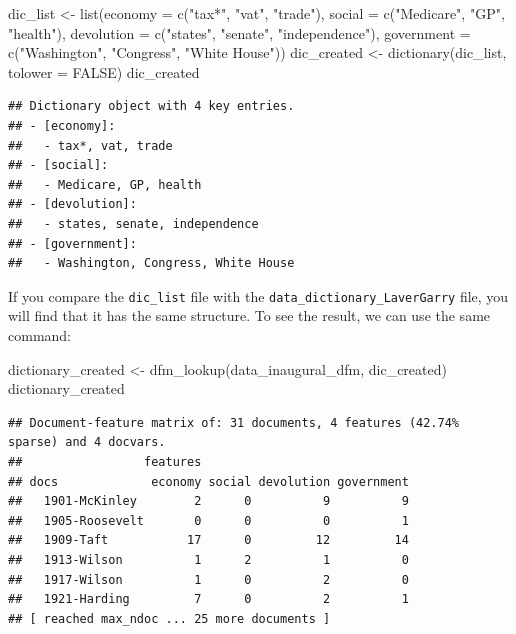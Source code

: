 \documentclass[
]{article}
\newenvironment{Shaded}{\begin{snugshade}}{\end{snugshade}}
\newcommand{\AttributeTok}[1]{\textcolor[rgb]{0.77,0.63,0.00}{#1}}
\newcommand{\ConstantTok}[1]{\textcolor[rgb]{0.00,0.00,0.00}{#1}}
\newcommand{\FunctionTok}[1]{\textcolor[rgb]{0.00,0.00,0.00}{#1}}
\newcommand{\NormalTok}[1]{#1}
\newcommand{\OtherTok}[1]{\textcolor[rgb]{0.56,0.35,0.01}{#1}}
\newcommand{\StringTok}[1]{\textcolor[rgb]{0.31,0.60,0.02}{#1}}
\begin{document}
\begin{Shaded}
\begin{Highlighting}[]
\NormalTok{dic\_list }\OtherTok{\textless{}{-}} \FunctionTok{list}\NormalTok{(}\AttributeTok{economy =} \FunctionTok{c}\NormalTok{(}\StringTok{"tax*"}\NormalTok{, }\StringTok{"vat"}\NormalTok{, }\StringTok{"trade"}\NormalTok{), }\AttributeTok{social =} \FunctionTok{c}\NormalTok{(}\StringTok{"Medicare"}\NormalTok{,}
    \StringTok{"GP"}\NormalTok{, }\StringTok{"health"}\NormalTok{), }\AttributeTok{devolution =} \FunctionTok{c}\NormalTok{(}\StringTok{"states"}\NormalTok{, }\StringTok{"senate"}\NormalTok{, }\StringTok{"independence"}\NormalTok{),}
    \AttributeTok{government =} \FunctionTok{c}\NormalTok{(}\StringTok{"Washington"}\NormalTok{, }\StringTok{"Congress"}\NormalTok{, }\StringTok{"White House"}\NormalTok{))}
\NormalTok{dic\_created }\OtherTok{\textless{}{-}} \FunctionTok{dictionary}\NormalTok{(dic\_list, }\AttributeTok{tolower =} \ConstantTok{FALSE}\NormalTok{)}
\NormalTok{dic\_created}
\end{Highlighting}
\end{Shaded}

\begin{verbatim}
## Dictionary object with 4 key entries.
## - [economy]:
##   - tax*, vat, trade
## - [social]:
##   - Medicare, GP, health
## - [devolution]:
##   - states, senate, independence
## - [government]:
##   - Washington, Congress, White House
\end{verbatim}

If you compare the \texttt{dic\_list} file with the \texttt{data\_dictionary\_LaverGarry} file, you will find that it has the same structure. To see the result, we can use the same command:

\begin{Shaded}
\begin{Highlighting}[]
\NormalTok{dictionary\_created }\OtherTok{\textless{}{-}} \FunctionTok{dfm\_lookup}\NormalTok{(data\_inaugural\_dfm, dic\_created)}
\NormalTok{dictionary\_created}
\end{Highlighting}
\end{Shaded}

\begin{verbatim}
## Document-feature matrix of: 31 documents, 4 features (42.74% sparse) and 4 docvars.
##                 features
## docs             economy social devolution government
##   1901-McKinley        2      0          9          9
##   1905-Roosevelt       0      0          0          1
##   1909-Taft           17      0         12         14
##   1913-Wilson          1      2          1          0
##   1917-Wilson          1      0          2          0
##   1921-Harding         7      0          2          1
## [ reached max_ndoc ... 25 more documents ]
\end{verbatim}
\end{document}
